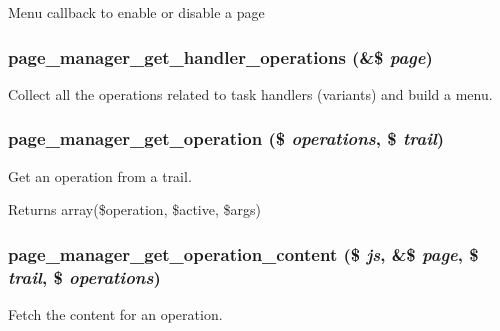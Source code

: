 \label{page__manager_8admin_8inc_a4199dbaf2894cca0b20bccbd5a9f821b}
Menu callback to enable or disable a page \hypertarget{page__manager_8admin_8inc_ac5ec1413c03ea5e18480ba053b13295a}{
\subsubsection[{page\_\-manager\_\-get\_\-handler\_\-operations}]{\setlength{\rightskip}{0pt plus 5cm}page\_\-manager\_\-get\_\-handler\_\-operations (\&\$ {\em page})}}
\label{page__manager_8admin_8inc_ac5ec1413c03ea5e18480ba053b13295a}
Collect all the operations related to task handlers (variants) and build a menu. \hypertarget{page__manager_8admin_8inc_a92cff2e11d6dd0661ecc4f39cf57babf}{
\subsubsection[{page\_\-manager\_\-get\_\-operation}]{\setlength{\rightskip}{0pt plus 5cm}page\_\-manager\_\-get\_\-operation (\$ {\em operations}, \/  \$ {\em trail})}}
\label{page__manager_8admin_8inc_a92cff2e11d6dd0661ecc4f39cf57babf}
Get an operation from a trail.

\begin{DoxyReturn}{Returns}
array(\$operation, \$active, \$args) 
\end{DoxyReturn}
\hypertarget{page__manager_8admin_8inc_a0e89fcc896c6d44a4b0559439d4a9689}{
\subsubsection[{page\_\-manager\_\-get\_\-operation\_\-content}]{\setlength{\rightskip}{0pt plus 5cm}page\_\-manager\_\-get\_\-operation\_\-content (\$ {\em js}, \/  \&\$ {\em page}, \/  \$ {\em trail}, \/  \$ {\em operations})}}
\label{page__manager_8admin_8inc_a0e89fcc896c6d44a4b0559439d4a9689}
Fetch the content for an operation.

